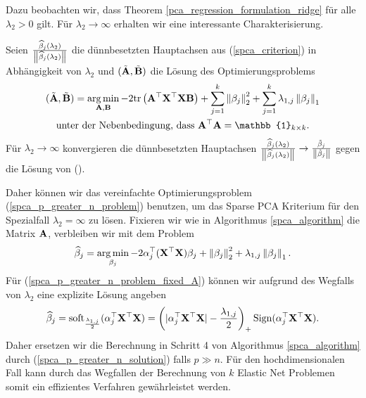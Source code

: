 Dazu beobachten wir, dass Theorem \ref{pca_regression_formulation_ridge} für alle $\lambda_2 > 0$ gilt. Für $\lambda_2 \to \infty$ erhalten wir eine interessante Charakterisierung.
\begin{thm} \label{spca_p_greater_n}
Seien $\frac{\widehat{\beta}_j(\lambda_2)}{\left\lVert \widehat{\beta}_j(\lambda_2) \right\rVert}$ die dünnbesetzten Hauptachsen aus (\ref{spca_criterion}) in Abhängigkeit von $\lambda_2$
und $(\tilde{\mathbf{A}}, \tilde{\mathbf{B}})$ die Lösung des Optimierungsproblems
\begin{align}
\label{spca_p_greater_n_problem}
\begin{gathered}
(\tilde{\mat A}, \tilde{\mat B}) = \argmin_{\mat A, \mat B} -2\spur{\mat A^{\top}\mat X^{\top}\mat X \mat B} + \sum_{j=1}^k \norm{\beta_j}_2^2 + \sum_{j=1}^k \lambda_{1,j}\norm{\beta_j}_1\\
\text{unter der Nebenbedingung, dass } \mat A^{\top} \mat A = \mat{\mathbb{1}}_{k \times k}.
\end{gathered}
\end{align}
Für $\lambda_2 \to \infty$ konvergieren die dünnbesetzten Hauptachsen $\frac{\widehat{\beta}_j(\lambda_2)}{\left\lVert \widehat{\beta}_j(\lambda_2) \right\rVert} \to \frac{\tilde{\beta}_j}{\left\lVert \tilde{\beta}_j \right\rVert}$ gegen die Lösung von (\label{spca_p_greater_n_problem}). 
\end{thm}

Daher können wir das vereinfachte Optimierungsproblem (\ref{spca_p_greater_n_problem}) benutzen, um das Sparse PCA Kriterium für den Spezialfall $\lambda_2 = \infty$ zu lösen. Fixieren wir wie in Algorithmus \ref{spca_algorithm} die Matrix $\mathbf{A}$, verbleiben wir mit dem Problem
\begin{align}
\label{spca_p_greater_n_problem_fixed_A}
\widehat{\beta}_j = \operatorname*{arg\,min}_{\beta_j} -2 \alpha_j^{\top}(\mathbf{X}^{\top}\mathbf{X})\beta_j + \left\lVert \beta_j \right\rVert_{2}^{2} + \lambda_{1,j}\left\lVert \beta_j \right\rVert_1.
\end{align}
Für (\ref{spca_p_greater_n_problem_fixed_A}) können wir aufgrund des Wegfalls von $\lambda_2$ eine explizite Lösung angeben
\begin{align}
\label{spca_p_greater_n_solution}
\widehat{\beta}_j = \operatorname{soft}_{\frac{\lambda_{1,j}}{2}}(\alpha_j^{\top}\mathbf{X}^{\top}\mathbf{X}) = \left(|\alpha_j^{\top}\mathbf{X}^{\top}\mathbf{X}| - \frac{\lambda_{1,j}}{2}\right)_+ \operatorname{Sign}(\alpha_j^{\top}\mathbf{X}^{\top}\mathbf{X}).
\end{align}
Daher ersetzen wir die Berechnung in Schritt 4 von Algorithmus \ref{spca_algorithm} durch (\ref{spca_p_greater_n_solution}) falls $p \gg n$. Für den hochdimensionalen Fall kann durch das Wegfallen der Berechnung von $k$ Elastic Net Problemen somit ein effizientes Verfahren gewährleistet werden.

